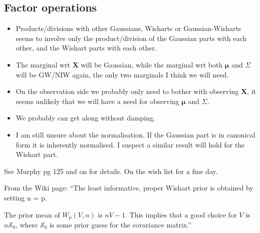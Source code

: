 \subsection{Factor operations}
\begin{itemize}
\item Products/divisions with other Gaussians, Wisharts or Gaussian-Wisharts
seems to involve only the product/division of the Gaussian parts with
each other, and the Wishart parts with each other.
\item The marginal wrt $\mathbf{X}$ will be Gaussian, while the marginal
wrt both $\mathbf{\mu}$ and $\Sigma$ will be GW/NIW again, the only
two marginals I think we will need.
\item On the observation side we probably only need to bother with observing
$\mathbf{X}$, it seems unlikely that we will have a need for observing
$\mathbf{\mu}$ and $\Sigma$.
\item We probably can get along without damping.
\item I am still unsure about the normalisation. If the Gaussian part is
in canonical form it is inherently normalised. I suspect a similar
result will hold for the Wishart part.
\end{itemize}
See Murphy pg 125 and on for details. On the wish list for a fine
day.



From the Wiki page: ``The least informative, proper Wishart prior
is obtained by setting n = p.

The prior mean of $W_p(V, n)$ is $nV-1$. This implies that a good
choice for $V$ is $n\mathcal{S}_0$, where $\mathcal{S}_0$ is some
prior guess for the covariance matrix.''
